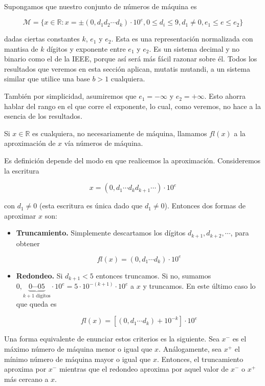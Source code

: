 Supongamos que nuestro conjunto de números de máquina es

\[\mathcal{M} = \{x \in \mathbb{R} : x = \pm (0, d_1 d_2 \cdots d_k) \cdot 10^e, 0 \leq d_i \leq 9, d_1 \neq 0, e_1 \leq e \leq e_2\}\]

dadas ciertas constantes $k$, $e_1$ y $e_2$. Esta es una representación normalizada con mantisa de $k$ dígitos y exponente entre $e_1$ y $e_2$. Es un sistema decimal y no binario como el de la IEEE, porque así será más fácil razonar sobre él. Todos los resultados que veremos en esta sección aplican, mutatis mutandi, a un sistema similar que utilice una base $b > 1$ cualquiera.

También por simplicidad, asumiremos que $e_1 = -\infty$ y $e_2 = +\infty$. Esto ahorra hablar del rango en el que corre el exponente, lo cual, como veremos, no hace a la esencia de los resultados.

\begin{defi}
Si $x \in \mathbb{R}$ es cualquiera, no necesariamente de máquina, llamamos $fl(x)$ a la aproximación de $x$ vía números de máquina. 
\end{defi}

Es definición depende del modo en que realicemos la aproximación. Consideremos la escritura

\[x = (0, d_1 \cdots d_kd_{k + 1} \cdots) \cdot 10^e\]
	
con $d_1 \neq 0$ (esta escritura es única dado que $d_1 \neq 0$). Entonces dos formas de aproximar $x$ son:

\begin{itemize}
	\item \textbf{Truncamiento.} Simplemente descartamos los dígitos $d_{k + 1}, d_{k + 2}, \cdots$, para obtener
	
	\[fl(x) = (0, d_1 \cdots d_k) \cdot 10^e\]

	\item \textbf{Redondeo.} Si $d_{k + 1} < 5$ entonces truncamos. Si no, sumamos $0,\underbrace{0 \cdots 05}_{k + 1 \text{ dígitos}} \cdot 10^e = 5 \cdot 10^{-(k + 1)} \cdot 10^e$ a $x$ y truncamos. En este último caso lo que queda es
	
	\[fl(x) = [(0, d_1 \cdots d_k) + 10^{-k}] \cdot 10^e\]

\end{itemize}

Una forma equivalente de enunciar estos criterios es la siguiente. Sea $x^{-}$ es el máximo número de máquina menor o igual que $x$. Análogamente, sea $x^{+}$ el mínimo número de máquina mayor o igual que $x$. Entonces, el truncamiento aproxima por $x^-$ mientras que el redondeo aproxima por aquel valor de $x^-$ o $x^+$ más cercano a $x$.

